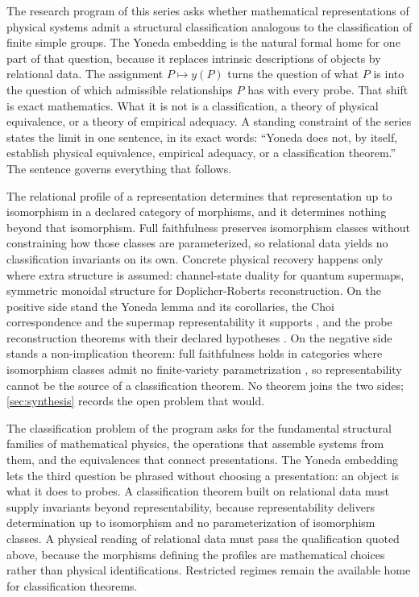 \documentclass[11pt,letterpaper]{article}
\theoremstyle{definition}
\theoremstyle{remark}
\begin{document}
The research program of this series asks whether mathematical representations of physical systems admit a structural classification analogous to the classification of finite simple groups. The Yoneda embedding is the natural formal home for one part of that question, because it replaces intrinsic descriptions of objects by relational data. The assignment $P \mapsto y(P)$ turns the question of what $P$ is into the question of which admissible relationships $P$ has with every probe. That shift is exact mathematics. What it is not is a classification, a theory of physical equivalence, or a theory of empirical adequacy. A standing constraint of the series states the limit in one sentence, in its exact words: ``Yoneda does not, by itself, establish physical equivalence, empirical adequacy, or a classification theorem.'' The sentence governs everything that follows.

The relational profile of a representation determines that representation up to isomorphism in a declared category of morphisms, and it determines nothing beyond that isomorphism. Full faithfulness preserves isomorphism classes without constraining how those classes are parameterized, so relational data yields no classification invariants on its own. Concrete physical recovery happens only where extra structure is assumed: channel-state duality for quantum supermaps, symmetric monoidal structure for Doplicher-Roberts reconstruction. On the positive side stand the Yoneda lemma and its corollaries, the Choi correspondence and the supermap representability it supports \cite{whh, hw}, and the probe reconstruction theorems with their declared hypotheses \cite{gn, stone, dr}. On the negative side stands a non-implication theorem: full faithfulness holds in categories where isomorphism classes admit no finite-variety parametrization \cite{buchweitz}, so representability cannot be the source of a classification theorem. No theorem joins the two sides; \cref{sec:synthesis} records the open problem that would.

The classification problem of the program asks for the fundamental structural families of mathematical physics, the operations that assemble systems from them, and the equivalences that connect presentations. The Yoneda embedding lets the third question be phrased without choosing a presentation: an object is what it does to probes. A classification theorem built on relational data must supply invariants beyond representability, because representability delivers determination up to isomorphism and no parameterization of isomorphism classes. A physical reading of relational data must pass the qualification quoted above, because the morphisms defining the profiles are mathematical choices rather than physical identifications. Restricted regimes remain the available home for classification theorems.
\end{document}
